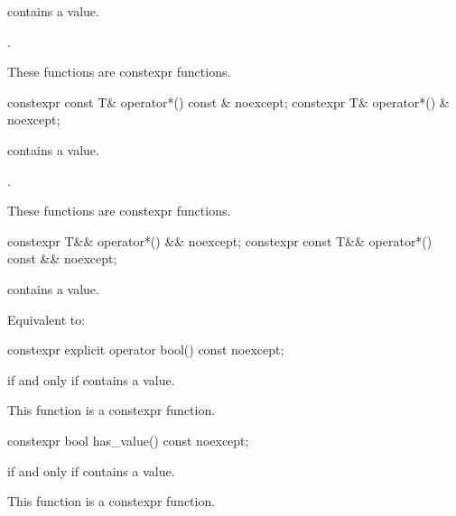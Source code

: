 \begin{itemdescr}
\pnum
\expects
{} contains a value.

\pnum
\returns
{}.

\pnum
\remarks
These functions are constexpr functions.
\end{itemdescr}

%
\begin{itemdecl}
constexpr const T& operator*() const & noexcept;
constexpr T& operator*() & noexcept;
\end{itemdecl}

\begin{itemdescr}
\pnum
\expects
{} contains a value.

\pnum
\returns
{}.

\pnum
\remarks
These functions are constexpr functions.
\end{itemdescr}

%
\begin{itemdecl}
constexpr T&& operator*() && noexcept;
constexpr const T&& operator*() const && noexcept;
\end{itemdecl}

\begin{itemdescr}
\pnum
\expects
{} contains a value.

\pnum
\effects
Equivalent to: 
\end{itemdescr}

%
\begin{itemdecl}
constexpr explicit operator bool() const noexcept;
\end{itemdecl}

\begin{itemdescr}
\pnum
\returns
{} if and only if  contains a value.

\pnum
\remarks
This function is a constexpr function.
\end{itemdescr}

%
\begin{itemdecl}
constexpr bool has_value() const noexcept;
\end{itemdecl}

\begin{itemdescr}
\pnum
\returns
{} if and only if  contains a value.

\pnum
\remarks
This function is a constexpr function.
\end{itemdescr}


